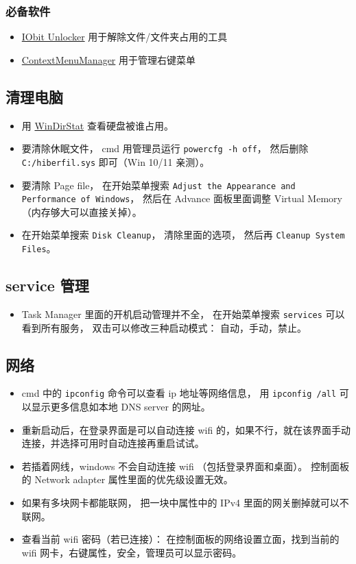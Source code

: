 \subsubsection{必备软件}
\begin{itemize}
\item \href{https://www.iobit.com/en/iobit-unlocker.php}{IObit Unlocker} 用于解除文件/文件夹占用的工具
\item \href{https://github.com/BluePointLilac/ContextMenuManager}{ContextMenuManager} 用于管理右键菜单
\end{itemize}

\subsection{清理电脑}
\begin{itemize}
\item 用 \href{https://windirstat.net/}{WinDirStat} 查看硬盘被谁占用。
\item 要清除休眠文件， cmd 用管理员运行 \verb|powercfg -h off|， 然后删除 \verb|C:/hiberfil.sys| 即可（Win 10/11 亲测）。
\item 要清除 Page file， 在开始菜单搜索 \verb|Adjust the Appearance and Performance of Windows|， 然后在 Advance 面板里面调整 Virtual Memory（内存够大可以直接关掉）。
\item 在开始菜单搜索 \verb|Disk Cleanup|， 清除里面的选项， 然后再 \verb|Cleanup System Files|。
\end{itemize}

\subsection{service 管理}
\begin{itemize}
\item Task Manager 里面的开机启动管理并不全， 在开始菜单搜索 \verb`services` 可以看到所有服务， 双击可以修改三种启动模式： 自动，手动，禁止。
\end{itemize}

\subsection{网络}
\begin{itemize}
\item cmd 中的 \verb|ipconfig| 命令可以查看 ip 地址等网络信息， 用 \verb`ipconfig /all` 可以显示更多信息如本地 DNS server 的网址。
\item 重新启动后，在登录界面是可以自动连接 wifi 的，如果不行，就在该界面手动连接，并选择可用时自动连接再重启试试。
\item 若插着网线，windows 不会自动连接 wifi （包括登录界面和桌面）。 控制面板的 Network adapter 属性里面的优先级设置无效。
\item 如果有多块网卡都能联网， 把一块中属性中的 IPv4 里面的网关删掉就可以不联网。
\item 查看当前 wifi 密码（若已连接）： 在控制面板的网络设置立面，找到当前的 wifi 网卡，右键属性，安全，管理员可以显示密码。
\end{itemize}

